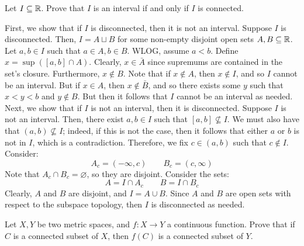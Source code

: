 \newpage
\label{q12}
\begin{qu}[num=12.1]
    Let $ I \subseteq \mathbb{R} $.
    Prove that $ I $ is an interval if and only if $ I $ is connected.
\end{qu}

\begin{soln}
    First, we show that if $ I $ is disconnected, then it is not an interval.
    \vsp
    Suppose $ I $ is disconnected. Then, $ I = A \sqcup B $ for some
    non-empty disjoint open sets $ A, B \subseteq \mathbb{R} $.
    Let $ a, b \in I $ such that $ a \in A, b \in B $. WLOG, assume $ a < b $.
    \vsp
    Define $ x = \sup([a,b] \cap A) $. Clearly, $ x \in \bar{A} $ since supremums
    are contained in the set's closure. Furthermore, $ x \notin B $. Note that if
    $ x \notin A $, then $ x \notin I $, and so $ I $ cannot be an interval.
    But if $ x \in A $, then $ x \notin \bar{B} $, and so there exists some $ y $
    such that $ x < y < b $ and $ y \notin B $. But then it follows that $ I $
    cannot be an interval as needed. \vsp
    Next, we show that if $ I $ is not an interval, then it is disconnected. \vsp
    Suppose $ I $ is not an interval.
    Then, there exist $ a, b \in I $ such that $ [a, b] \nsubseteq I $.
    We must also have that $ (a, b) \nsubseteq I $; indeed, if this is not the
    case, then it follows that either $ a $ or $ b $ is not in $ I $, which is a
    contradiction. Therefore, we fix $ c \in (a, b) $ such that $ c \notin I $.
    Consider:
    \begin{equation*}
        A_{c} = (-\infty, c) \qquad B_{c} = (c, \infty)
    \end{equation*}
    Note that $ A_{c} \cap B_{c} = \varnothing $, so they are disjoint. Consider
    the sets:
    \begin{equation*}
        A = I \cap A_{c} \qquad B = I \cap B_{c}
    \end{equation*}
    Clearly, $ A $ and $ B $ are disjoint, and $ I = A \cup B $.
    Since $ A $ and $ B $ are open sets with respect to the subspace topology,
    then $ I $ is disconnected as needed.
\end{soln}

\newpage
\begin{qu}[num=12.2]
    Let $ X, Y $ be two metric spaces, and $ f : X \longrightarrow Y $ a
    continuous function. Prove that if $ C $ is a connected subset of $ X $,
    then $ f(C) $ is a connected subset of $ Y $.
\end{qu}

